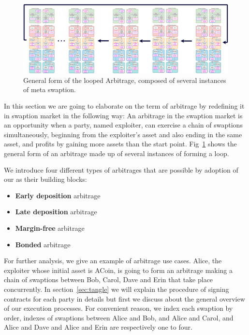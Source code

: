 \label{sec:arbitrage}
\begin{figure}[!ht]
    \centering
    \includegraphics[width=\textwidth]{figures/looped arb.png}
    \caption{General form of the looped Arbitrage, composed of several instances of meta swaption.}
    \label{fig:meta_arb}
\end{figure}

In this section we are going to elaborate on the term of arbitrage by redefining it in swaption market in the following way:
An arbitrage in the swaption market is an opportunity when a party, named exploiter, can exercise a chain of swaptions simultaneously, beginning from the exploiter's asset and also ending in the same asset, and profits by gaining more assets than the start point. Fig~\ref{fig:meta_arb} shows the general form of an arbitrage made up of several instances of \MetaSwaption forming a loop.


We introduce four different types of arbitrages that are possible by adoption of our \MetaSwaption as their building blocks:
\begin{itemize}
    \item \textbf{Early deposition} arbitrage
    \item \textbf{Late deposition} arbitrage
    \item \textbf{Margin-free} arbitrage
    \item \textbf{Bonded} arbitrage
\end{itemize}


For further analysis, we give an example of arbitrage use cases. Alice, the exploiter whose initial asset is ACoin, is going to form an arbitrage making a chain of swaptions between Bob, Carol, Dave and Erin that take place concurrently. In section~\ref{sec:tangle} we will explain the procedure of signing contracts for each party in details but first we discuss about the general overview of our execution processes. For convenient reason, we index each swaption by order, \ie indexes of swaptions between Alice and Bob, and Alice and Carol, and Alice and Dave and Alice and Erin are respectively one to four.

